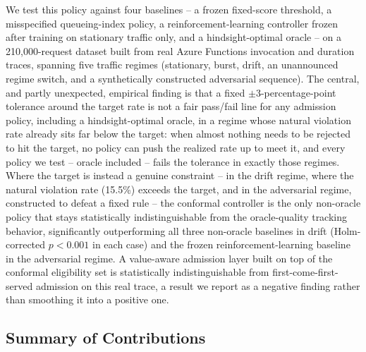 \documentclass[11pt,letterpaper]{article}
\begin{document}
We test this policy against four baselines -- a frozen fixed-score threshold, a misspecified queueing-index policy, a reinforcement-learning controller frozen after training on stationary traffic only, and a hindsight-optimal oracle -- on a 210,000-request dataset built from real Azure Functions invocation and duration traces, spanning five traffic regimes (stationary, burst, drift, an unannounced regime switch, and a synthetically constructed adversarial sequence). The central, and partly unexpected, empirical finding is that a fixed $\pm$3-percentage-point tolerance around the target rate is not a fair pass/fail line for any admission policy, including a hindsight-optimal oracle, in a regime whose natural violation rate already sits far below the target: when almost nothing needs to be rejected to hit the target, no policy can push the realized rate up to meet it, and every policy we test -- oracle included -- fails the tolerance in exactly those regimes. Where the target is instead a genuine constraint -- in the drift regime, where the natural violation rate (15.5\%) exceeds the target, and in the adversarial regime, constructed to defeat a fixed rule -- the conformal controller is the only non-oracle policy that stays statistically indistinguishable from the oracle-quality tracking behavior, significantly outperforming all three non-oracle baselines in drift (Holm-corrected $p < 0.001$ in each case) and the frozen reinforcement-learning baseline in the adversarial regime. A value-aware admission layer built on top of the conformal eligibility set is statistically indistinguishable from first-come-first-served admission on this real trace, a result we report as a negative finding rather than smoothing it into a positive one.

\subsection{Summary of Contributions}
\end{document}
